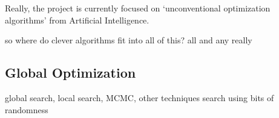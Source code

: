 \documentclass[a4paper, 11pt]{article}
\begin{document}
Really, the project is currently focused on `unconventional optimization algorithms' from Artificial Intelligence.

so where do clever algorithms fit into all of this?
all and any really


\subsection{Global Optimization}
global search, local search, MCMC, other techniques
search using bits of randomness




\end{document}
